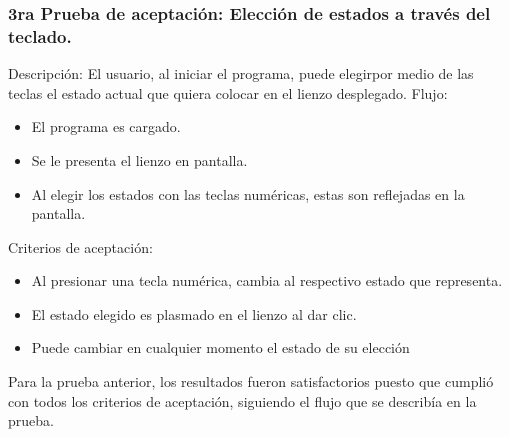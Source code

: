     \subsubsection{3ra Prueba de aceptaci\'on: Elecci\'on de estados a trav\'es del teclado.}
        Descripci\'on: El usuario, al iniciar el programa, puede elegirpor medio de las teclas el estado actual que quiera colocar en
            el lienzo desplegado.
        Flujo:
        \begin{itemize}
            \item El programa es cargado.
            \item Se le presenta el lienzo en pantalla.
            \item Al elegir los estados con las teclas num\'ericas, estas son
            reflejadas en la pantalla.
        \end{itemize}
        \vskip 0.5cm
        Criterios de aceptaci\'on:
        \begin{itemize}
            \item Al presionar una tecla num\'erica, cambia al respectivo
            estado que representa.
            \item El estado elegido es plasmado en el lienzo al dar clic.
            \item Puede cambiar en cualquier momento el estado de su
            elecci\'on
        \end{itemize}
        \vskip 0.5cm
        Para la prueba anterior, los resultados fueron satisfactorios
            puesto que cumpli\'o con todos los criterios de aceptaci\'on,
            siguiendo el flujo que se describ\'ia en la prueba.
    \vskip 0.5cm
